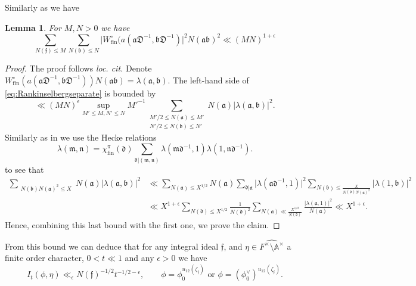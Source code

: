 \documentclass[a4paper,11pt]{amsart}
\newtheorem{lemma}[theorem]{Lemma}
\theoremstyle{definition}
\newcommand{\N}{\mathbb{N}}
\newcommand{\A}{\mathbb{A}}
\newcommand{\fin}{\text{fin}}
\begin{document}
Similarly as \cite[(2.5)]{nelsonholowinsky} we have
\begin{lemma}\label{lem:rankinweneed}
    For $M,N>0$ we have
    \begin{equation}\label{eq:Rankinselbergseparate}\sum_{N(\mathfrak{f})\leq M}\sum_{N(\mathfrak{b})\leq N}\vert{W_{\operatorname{fin}}^{\circ}(a(\mathfrak{aD}^{-1},\mathfrak{bD}^{-1})}\vert^2N(\mathfrak{ab})^2 \ll (MN)^{1+\epsilon} \end{equation}
\end{lemma}
\begin{proof} The proof follows \emph{loc. cit.} Denote $W_{\fin}^{\circ}(a(\mathfrak{aD^{-1}},\mathfrak{bD}^{-1}))N(\mathfrak{ab}) = \lambda(\mathfrak{a},\mathfrak{b})$.
 The left-hand side of \eqref{eq:Rankinselbergseparate} is bounded by 
  \[ \ll (MN)^{\epsilon}\sup_{M'\leq M,N'\leq N}M'^{-1}\sum_{\substack{M'/2\leq N(\mathfrak{a})\leq M'\\N'/2\leq N(\mathfrak{b})\leq N'}}N(\mathfrak{a})\vert{\lambda(\mathfrak{a},\mathfrak{b})}\vert^2.\]
  Similarly as in \cite[Lemma 2]{Munshi1} we use the Hecke relations  
  \[\lambda(\mathfrak{m},\mathfrak{n}) = \chi^{\pi}_{\fin}(\mathfrak{d})\sum_{\mathfrak{d}|(\mathfrak{m},\mathfrak{n})}\lambda(\mathfrak{md}^{-1},1)\lambda(1,\mathfrak{nd}^{-1}). \]
  to see that 
  \begin{align*}
      \sum_{\substack{N(\mathfrak{b})N(\mathfrak{a})^2\leq X}}N(\mathfrak{a})\vert{\lambda(\mathfrak{a},\mathfrak{b})}\vert^2 &\ll \sum_{N(\mathfrak{a})\leq X^{1/2}}N(\mathfrak{a})\sum_{\mathfrak{d}|\mathfrak{a}}\vert{\lambda(\mathfrak{ad}^{-1},1)}\vert^2\sum_{N(\mathfrak{b})\leq \frac{X}{N(\mathfrak{d})N(\mathfrak{a})^2}}\vert{\lambda(1,\mathfrak{b})}\vert^2\\&\ll X^{1+\epsilon}\sum_{N(\mathfrak{d})\leq X^{1/2}}\frac{1}{N(\mathfrak{d})^2}\sum_{N(\mathfrak{a})\ll \frac{X^{1/2}}{N(\mathfrak{d})}}\frac{\vert{\lambda(\mathfrak{a},1)}\vert^2}{N(\mathfrak{a})}\ll X^{1+\epsilon}.
  \end{align*}
  Hence, combining this last bound with the first one, we prove the claim.
\end{proof}
From this bound we can deduce that for any integral ideal $\mathfrak{f}$, and $\eta\in \widehat{F^{\times}\setminus \A^{\times}}$ a finite order character, $0<t\ll 1$ and any $\epsilon >0$ we have 
\begin{equation*}\label{eq:7rankinselberg}
    I_t(\phi,\eta) \ll_{\epsilon} N(\mathfrak{f})^{-1/2}t^{-1/2-\epsilon}, \qquad \phi = \phi_0^{u_{12}(\zeta_\mathfrak{f})} \text{ or } \phi = (\phi_0^{\vee})^{u_{12}(\zeta_\mathfrak{f})}.
\end{equation*}
\end{document}
